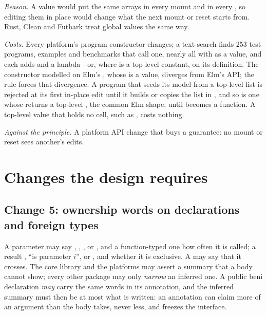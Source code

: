 \emph{Reason.} A value  would put the same arrays in every mount and in every , so
editing them in place would change what the next mount or reset starts from. Rust, Clean and Futhark treat
global values the same way.

\emph{Costs.} Every platform's program constructor changes; a text search finds 253 test programs, examples
and benchmarks that call one, nearly all with  as a value, and each adds  and a
lambda---or, where  is a top-level constant,  on its definition. The constructor
modelled on Elm's , whose  is a value, diverges from Elm's API; the rule
forces that divergence. A program that seeds its model from a top-level list is rejected at its first
in-place edit until it builds or copies the list in , and so is one whose  returns a
top-level , the common Elm shape, until  becomes a function. A
top-level value that holds no cell, such as , costs nothing.

\emph{Against the principle.} A platform API change that buys a guarantee: no mount or reset sees another's
edits.

\section{Changes the design requires}

\subsection*{Change 5: ownership words on  declarations and foreign types}

A  parameter may say , , ,  or
, and a function-typed one how often it is called; a result , ``is parameter
$i$'',  or , and whether it is exclusive. A  may say that it
crosses. The core library and the platforms may assert a summary that a body cannot show; every other
package may only \emph{narrow} an inferred one. A public beni declaration \emph{may} carry the same words in
its annotation, and the inferred summary must then be at most what is written: an annotation can claim
more of an argument than the body takes, never less, and freezes the interface.

